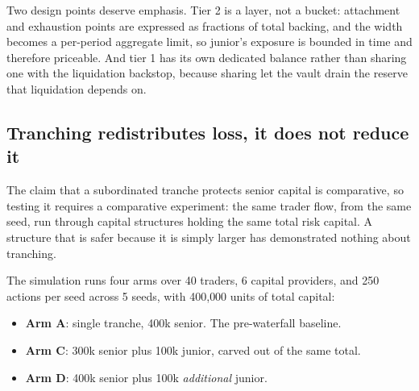 \documentclass[11pt,a4paper]{article}
\begin{document}
Two design points deserve emphasis. Tier 2 is a layer, not a bucket: attachment and
exhaustion points are expressed as fractions of total backing, and the width becomes a
per-period aggregate limit, so junior's exposure is bounded in time and therefore priceable.
And tier 1 has its own dedicated balance rather than sharing one with the liquidation
backstop, because sharing let the vault drain the reserve that liquidation depends on.

\subsection{Tranching redistributes loss, it does not reduce it}

The claim that a subordinated tranche protects senior capital is comparative, so testing it
requires a comparative experiment: the same trader flow, from the same seed, run through
capital structures holding the same total risk capital. A structure that is safer because it
is simply larger has demonstrated nothing about tranching.

The simulation runs four arms over 40 traders, 6 capital providers, and 250 actions per seed
across 5 seeds, with 400{,}000 units of total capital:

\begin{itemize}[leftmargin=1.4em, itemsep=2pt]
\item \textbf{Arm A}: single tranche, 400k senior. The pre-waterfall baseline.
\item \textbf{Arm C}: 300k senior plus 100k junior, carved out of the same total.
\item \textbf{Arm D}: 400k senior plus 100k \emph{additional} junior.
\end{itemize}
\end{document}
